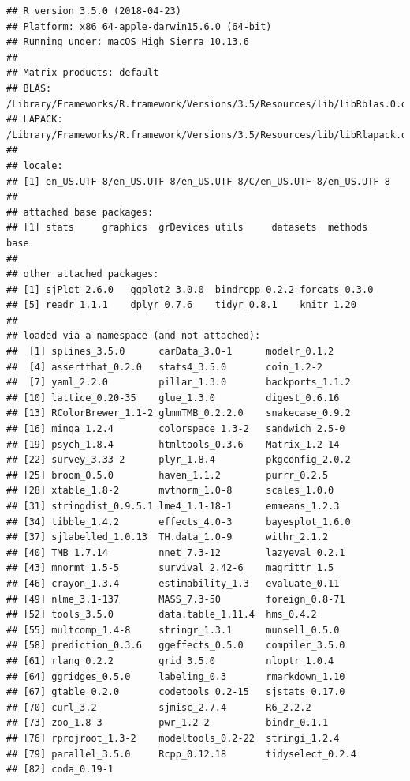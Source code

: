 \documentclass[]{article}
\begin{document}
\begin{verbatim}
## R version 3.5.0 (2018-04-23)
## Platform: x86_64-apple-darwin15.6.0 (64-bit)
## Running under: macOS High Sierra 10.13.6
## 
## Matrix products: default
## BLAS: /Library/Frameworks/R.framework/Versions/3.5/Resources/lib/libRblas.0.dylib
## LAPACK: /Library/Frameworks/R.framework/Versions/3.5/Resources/lib/libRlapack.dylib
## 
## locale:
## [1] en_US.UTF-8/en_US.UTF-8/en_US.UTF-8/C/en_US.UTF-8/en_US.UTF-8
## 
## attached base packages:
## [1] stats     graphics  grDevices utils     datasets  methods   base     
## 
## other attached packages:
## [1] sjPlot_2.6.0   ggplot2_3.0.0  bindrcpp_0.2.2 forcats_0.3.0 
## [5] readr_1.1.1    dplyr_0.7.6    tidyr_0.8.1    knitr_1.20    
## 
## loaded via a namespace (and not attached):
##  [1] splines_3.5.0      carData_3.0-1      modelr_0.1.2      
##  [4] assertthat_0.2.0   stats4_3.5.0       coin_1.2-2        
##  [7] yaml_2.2.0         pillar_1.3.0       backports_1.1.2   
## [10] lattice_0.20-35    glue_1.3.0         digest_0.6.16     
## [13] RColorBrewer_1.1-2 glmmTMB_0.2.2.0    snakecase_0.9.2   
## [16] minqa_1.2.4        colorspace_1.3-2   sandwich_2.5-0    
## [19] psych_1.8.4        htmltools_0.3.6    Matrix_1.2-14     
## [22] survey_3.33-2      plyr_1.8.4         pkgconfig_2.0.2   
## [25] broom_0.5.0        haven_1.1.2        purrr_0.2.5       
## [28] xtable_1.8-2       mvtnorm_1.0-8      scales_1.0.0      
## [31] stringdist_0.9.5.1 lme4_1.1-18-1      emmeans_1.2.3     
## [34] tibble_1.4.2       effects_4.0-3      bayesplot_1.6.0   
## [37] sjlabelled_1.0.13  TH.data_1.0-9      withr_2.1.2       
## [40] TMB_1.7.14         nnet_7.3-12        lazyeval_0.2.1    
## [43] mnormt_1.5-5       survival_2.42-6    magrittr_1.5      
## [46] crayon_1.3.4       estimability_1.3   evaluate_0.11     
## [49] nlme_3.1-137       MASS_7.3-50        foreign_0.8-71    
## [52] tools_3.5.0        data.table_1.11.4  hms_0.4.2         
## [55] multcomp_1.4-8     stringr_1.3.1      munsell_0.5.0     
## [58] prediction_0.3.6   ggeffects_0.5.0    compiler_3.5.0    
## [61] rlang_0.2.2        grid_3.5.0         nloptr_1.0.4      
## [64] ggridges_0.5.0     labeling_0.3       rmarkdown_1.10    
## [67] gtable_0.2.0       codetools_0.2-15   sjstats_0.17.0    
## [70] curl_3.2           sjmisc_2.7.4       R6_2.2.2          
## [73] zoo_1.8-3          pwr_1.2-2          bindr_0.1.1       
## [76] rprojroot_1.3-2    modeltools_0.2-22  stringi_1.2.4     
## [79] parallel_3.5.0     Rcpp_0.12.18       tidyselect_0.2.4  
## [82] coda_0.19-1
\end{verbatim}
\end{document}
